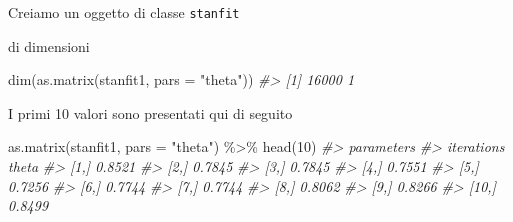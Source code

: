 \documentclass[
  11pt,
]{krantz}
\makeatletter
\newenvironment{Shaded}{\begin{snugshade}}{\end{snugshade}}
\newcommand{\AttributeTok}[1]{\textcolor[rgb]{0.61,0.61,0.61}{#1}}
\newcommand{\CommentTok}[1]{\textcolor[rgb]{0.37,0.37,0.37}{\textit{#1}}}
\newcommand{\DecValTok}[1]{\textcolor[rgb]{0.06,0.06,0.06}{#1}}
\newcommand{\FunctionTok}[1]{\textcolor[rgb]{0,0,0}{#1}}
\newcommand{\NormalTok}[1]{#1}
\newcommand{\OtherTok}[1]{\textcolor[rgb]{0.37,0.37,0.37}{#1}}
\newcommand{\SpecialCharTok}[1]{\textcolor[rgb]{0,0,0}{#1}}
\newcommand{\StringTok}[1]{\textcolor[rgb]{0.5,0.5,0.5}{#1}}
\newenvironment{kframe}{%
\medskip{}
\setlength{\fboxsep}{.8em}
 \def\at@end@of@kframe{}%
 \ifinner\ifhmode%
  \def\at@end@of@kframe{\end{minipage}}%
  \begin{minipage}{\columnwidth}%
 \fi\fi%
 \def\FrameCommand##1{\hskip\@totalleftmargin \hskip-\fboxsep
 \colorbox{shadecolor}{##1}\hskip-\fboxsep
     \hskip-\linewidth \hskip-\@totalleftmargin \hskip\columnwidth}%
 \MakeFramed {\advance\hsize-\width
   \@totalleftmargin\z@ \linewidth\hsize
   \@setminipage}}%
 {\par\unskip\endMakeFramed%
 \at@end@of@kframe}
\renewenvironment{Shaded}{\begin{kframe}}{\end{kframe}}
\theoremstyle{definition}
\theoremstyle{definition}
\theoremstyle{definition}
\theoremstyle{definition}
\theoremstyle{remark}
\makeatother
\begin{document}
\begin{Shaded}
\end{Shaded}

Creiamo un oggetto di classe \texttt{stanfit}

\begin{Shaded}
\end{Shaded}

di dimensioni

\begin{Shaded}
\begin{Highlighting}[]
\FunctionTok{dim}\NormalTok{(}\FunctionTok{as.matrix}\NormalTok{(stanfit1, }\AttributeTok{pars =} \StringTok{"theta"}\NormalTok{))}
\CommentTok{\#\textgreater{} [1] 16000     1}
\end{Highlighting}
\end{Shaded}

I primi 10 valori sono presentati qui di seguito

\begin{Shaded}
\begin{Highlighting}[]
\FunctionTok{as.matrix}\NormalTok{(stanfit1, }\AttributeTok{pars =} \StringTok{"theta"}\NormalTok{) }\SpecialCharTok{\%\textgreater{}\%} 
  \FunctionTok{head}\NormalTok{(}\DecValTok{10}\NormalTok{)}
\CommentTok{\#\textgreater{}           parameters}
\CommentTok{\#\textgreater{} iterations  theta}
\CommentTok{\#\textgreater{}       [1,] 0.8521}
\CommentTok{\#\textgreater{}       [2,] 0.7845}
\CommentTok{\#\textgreater{}       [3,] 0.7845}
\CommentTok{\#\textgreater{}       [4,] 0.7551}
\CommentTok{\#\textgreater{}       [5,] 0.7256}
\CommentTok{\#\textgreater{}       [6,] 0.7744}
\CommentTok{\#\textgreater{}       [7,] 0.7744}
\CommentTok{\#\textgreater{}       [8,] 0.8062}
\CommentTok{\#\textgreater{}       [9,] 0.8266}
\CommentTok{\#\textgreater{}      [10,] 0.8499}
\end{Highlighting}
\end{Shaded}
\end{document}
